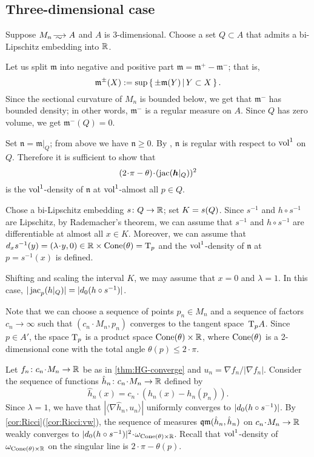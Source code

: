 \subsection{Three-dimensional case}


Suppose $M_n\smooths{}A$ and $A$ is 3-dimensional.
Choose a set $Q\subset A$ that admits a bi-Lipschitz embedding into $\mathbb{R}$. 

Let us split $\mathfrak m$ into negative and positive part $\mathfrak m=\mathfrak m^+-\mathfrak m^-$; that is,
\[\mathfrak m^\pm(X)\mathrel{{:}{=}}\sup\left\{\,\pm\mathfrak m(Y)\,\middle|\,Y\subset X\,\right\}.\]
Since the sectional curvature of $M_n$ is bounded below, we get that $\mathfrak m^-$ has bounded density; in other words, $\mathfrak m^-$ is a regular measure on $A$.
Since $Q$ has zero volume, we get $\mathfrak m^-(Q)=0$.

Set $\mathfrak n=\mathfrak m|_{Q}$; from above we have $\mathfrak n\ge 0$.
By \cite{petrunin-SC}, $\mathfrak n$ is regular with respect to $\operatorname{vol}^1$ on $Q$.
Therefore it is sufficient to show that 
\[(2\cdot\pi-\theta)\cdot (\jac(\bm{h}|_Q))^2\]
is the $\operatorname{vol}^1$-density of $\mathfrak n$
at $\operatorname{vol}^1$-almost all $p\in Q$.

Chose a bi-Lipschitz embedding $s\colon Q\to \mathbb{R}$;
set $K\zz=s(Q)$.
Since $s^{-1}$ and $h\circ s^{-1}$ are Lipschitz, 
by Rademacher's theorem, we can assume that $s^{-1}$ and $h\circ s^{-1}$ are differentiable at almost all $x\in K$.
Moreover, we can assume that $d_xs^{-1}(y)=(\lambda\cdot y,0)\in \RR\times \Cone(\theta)=\T_p$ and the $\operatorname{vol}^1$-density of $\mathfrak n$ at $p=s^{-1}(x)$ is defined.

Shifting and scaling the interval $K$, we may assume that $x=0$ and $\lambda=1$.
In this case, $|\mathop{\rm jac}_p(h|_Q)|=|d_0(h\circ s^{-1})|$.

Note that we can choose a sequence of points $p_n\in M_n$ and a sequence of factors $c_n\to \infty$ such that $(c_n\cdot M_n,p_n)$ converges to the tangent space~$\mathrm{T}_pA$.
Since $p\in A'$, the space $\mathrm{T}_p$ is a product space $\operatorname{Cone}(\theta)\times\mathbb{R}$, where $\operatorname{Cone}(\theta)$ is a 2-dimensional cone with the total angle $\theta(p)\le2\cdot\pi$.

Let $f_n\:c_n\cdot M_n\to \RR$ be as in \ref{thm:HG-converge} and $u_n=\nabla f_n/|\nabla f_n|$.
Consider the sequence of functions $\hat h_n\:c_n\cdot M_n\to \RR$ defined by 
\[\hat h_n(x)=c_n\cdot(h_n(x)-h_n(p_n)).\]
Since $\lambda=1$, we have that $|\langle\nabla \hat h_n,u_n\rangle|$ uniformly converges to $|d_0(h\zz\circ s^{-1})|$.
By \ref{cor:Ricci}(\ref{cor:Ricci:vw}), the sequence of measures $\operatorname{\mathfrak{qm}}(\hat h_n, \hat h_n)$ on $c_n\cdot M_n\to \RR$ weakly converges to $|d_0(h\zz\circ s^{-1})|^2\cdot\omega_{\Cone(\theta)\times\RR}$.
Recall that $\operatorname{vol}^1$-density of $\omega_{\operatorname{Cone}(\theta)\times\mathbb{R}}$ on the singular line is $2\cdot \pi-\theta(p)$.


